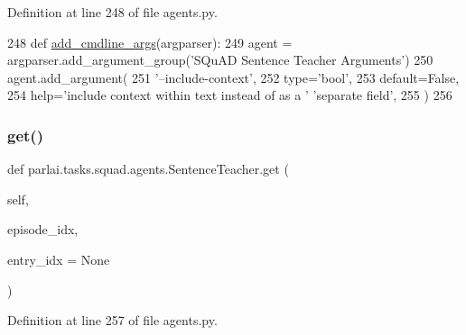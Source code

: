 Definition at line 248 of file agents.\+py.


\begin{DoxyCode}
248     \textcolor{keyword}{def }\hyperlink{namespaceparlai_1_1agents_1_1drqa_1_1config_a62fdd5554f1da6be0cba185271058320}{add\_cmdline\_args}(argparser):
249         agent = argparser.add\_argument\_group(\textcolor{stringliteral}{'SQuAD Sentence Teacher Arguments'})
250         agent.add\_argument(
251             \textcolor{stringliteral}{'--include-context'},
252             type=\textcolor{stringliteral}{'bool'},
253             default=\textcolor{keyword}{False},
254             help=\textcolor{stringliteral}{'include context within text instead of as a '} \textcolor{stringliteral}{'separate field'},
255         )
256 
\end{DoxyCode}
\mbox{\label{classparlai_1_1tasks_1_1squad_1_1agents_1_1SentenceTeacher_a940eaa197e21e8237fc459e55d68d61f}} 
\subsubsection{\texorpdfstring{get()}{get()}}
{\footnotesize\ttfamily def parlai.\+tasks.\+squad.\+agents.\+Sentence\+Teacher.\+get (\begin{DoxyParamCaption}\item[{}]{self,  }\item[{}]{episode\+\_\+idx,  }\item[{}]{entry\+\_\+idx = {\ttfamily None} }\end{DoxyParamCaption})}



Definition at line 257 of file agents.\+py.


